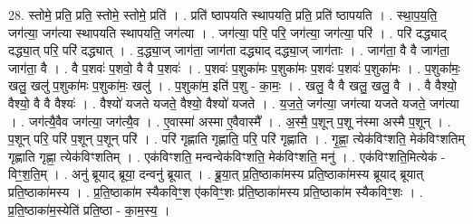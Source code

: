 \documentclass[17pt]{extarticle}
\begin{document}
28. स्तोमे॒ प्रति॒ प्रति॒ स्तोमे॒ स्तोमे॒ प्रति॑ । . प्रति॑ ष्ठापयति स्थापयति॒ प्रति॒ प्रति॑ ष्ठापयति । . स्था॒प॒य॒ति॒ जग॑त्या॒ जग॑त्या स्थापयति स्थापयति॒ जग॑त्या । . जग॑त्या॒ परि॒ परि॒ जग॑त्या॒ जग॑त्या॒ परि॑ । . परि॑ दद्ध्याद् दद्ध्या॒त् परि॒ परि॑ दद्ध्यात् । . द॒द्ध्या॒ज् जाग॑ता॒ जाग॑ता दद्ध्याद् दद्ध्या॒ज् जाग॑ताः । . जाग॑ता॒ वै वै जाग॑ता॒ जाग॑ता॒ वै । . वै प॒शवः॑ प॒शवो॒ वै वै प॒शवः॑ । . प॒शवः॑ प॒शुका॑मः प॒शुका॑मः प॒शवः॑ प॒शवः॑ प॒शुका॑मः । . प॒शुका॑मः॒ खलु॒ खलु॑ प॒शुका॑मः प॒शुका॑मः॒ खलु॑ । . प॒शुका॑म॒ इति॑ प॒शु - का॒मः॒ । . खलु॒ वै वै खलु॒ खलु॒ वै । . वै वैश्यो॒ वैश्यो॒ वै वै वैश्यः॑ । . वैश्यो॑ यजते यजते॒ वैश्यो॒ वैश्यो॑ यजते । . य॒ज॒ते॒ जग॑त्या॒ जग॑त्या यजते यजते॒ जग॑त्या । . जग॑त्यै॒वैव जग॑त्या॒ जग॑त्यै॒व । . ए॒वास्मा॑ अस्मा ए॒वैवास्मै᳚ । . अ॒स्मै॒ प॒शून् प॒शू न॑स्मा अस्मै प॒शून् । . प॒शून् परि॒ परि॑ प॒शून् प॒शून् परि॑ । . परि॑ गृह्णाति गृह्णाति॒ परि॒ परि॑ गृह्णाति । . गृ॒ह्णा॒ त्येक॑विꣳशति॒ मेक॑विꣳशतिम् गृह्णाति गृह्णा॒ त्येक॑विꣳशतिम् । . एक॑विꣳशति॒ मन्वन्वेक॑विꣳशति॒ मेक॑विꣳशति॒ मनु॑ । . एक॑विꣳशति॒मित्येक॑ - विꣳ॒॒श॒ति॒म् । . अनु॑ ब्रूयाद् ब्रूया॒ दन्वनु॑ ब्रूयात् । . ब्रू॒या॒त् प्र॒ति॒ष्ठाका॑मस्य प्रति॒ष्ठाका॑मस्य ब्रूयाद् ब्रूयात् प्रति॒ष्ठाका॑मस्य । . प्र॒ति॒ष्ठाका॑म स्यैकविꣳ॒॒श ए॑कविꣳ॒॒शः प्र॑ति॒ष्ठाका॑मस्य प्रति॒ष्ठाका॑म स्यैकविꣳ॒॒शः । . प्र॒ति॒ष्ठाका॑म॒स्येति॑ प्रति॒ष्ठा - का॒म॒स्य॒ । \newline
\end{document}

